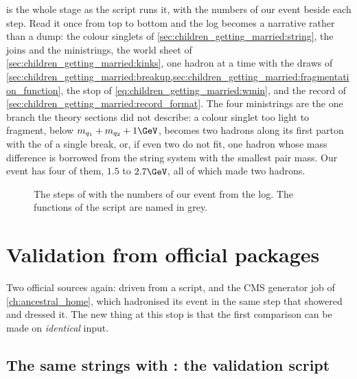  is the whole stage as the script
runs it, with the numbers of our event beside each step. Read it once from
top to bottom and the  log becomes a narrative rather than a dump:
the colour singlets of \cref{sec:children_getting_married:string}, the
joins and the ministrings, the world sheet of
\cref{sec:children_getting_married:kinks}, one hadron at a time with the
draws of \cref{sec:children_getting_married:breakup,sec:children_getting_married:fragmentation_function},
the stop of \cref{eq:children_getting_married:wmin}, and the record of
\cref{sec:children_getting_married:record_format}. The four ministrings
are the one branch the theory sections did not describe: a colour singlet
too light to fragment, below $m_{q_1}+m_{q_2}+1\GeV$, becomes two hadrons
along its first parton with the \pt of a single break, or, if even two do
not fit, one hadron whose mass difference is borrowed from the string
system with the smallest pair mass. Our event has four of them, $1.5$ to
$2.7\GeV$, all of which made two hadrons.

\begin{figure}[htbp]\centering
\resizebox{\textwidth}{!}{}
\caption[The hadronisation stage as a flow chart]{The steps of
 with the numbers of our event from the
 log. The functions of the script are named in grey.}
\label{fig:children_getting_married:flow}
\end{figure}

\section{Validation from official packages}
\label{sec:children_getting_married:validation}

Two official sources again: \PYTHIA driven from a script, and the CMS
generator job of \cref{ch:ancestral_home}, which hadronised its event in
the same step that showered and dressed it. The new thing at this stop is
that the first comparison can be made on \emph{identical} input.

\subsection{The same strings with \PYTHIA: the validation script}
\label{sec:children_getting_married:pythia}

